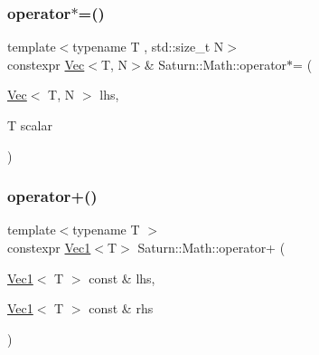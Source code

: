 \mbox{\label{namespace_saturn_1_1_math_a7bfe08b15fdd66d20ee95faf2a3327cf}} 
\subsubsection{\texorpdfstring{operator$\ast$=()}{operator*=()}}
{\footnotesize\ttfamily template$<$typename T , std\+::size\+\_\+t N$>$ \\
constexpr \mbox{\hyperlink{class_saturn_1_1_math_1_1_vec}{Vec}}$<$T, N$>$\& Saturn\+::\+Math\+::operator$\ast$= (\begin{DoxyParamCaption}\item[{\mbox{\hyperlink{class_saturn_1_1_math_1_1_vec}{Vec}}$<$ T, N $>$}]{lhs,  }\item[{T}]{scalar }\end{DoxyParamCaption})}

\mbox{\label{namespace_saturn_1_1_math_af62e54a4d566d6102eaed7d3495b89cf}} 
\subsubsection{\texorpdfstring{operator+()}{operator+()}\hspace{0.1cm}{\footnotesize\ttfamily [1/4]}}
{\footnotesize\ttfamily template$<$typename T $>$ \\
constexpr \mbox{\hyperlink{namespace_saturn_1_1_math_acae4f808f0c3284d0b60ee1ac720deaa}{Vec1}}$<$T$>$ Saturn\+::\+Math\+::operator+ (\begin{DoxyParamCaption}\item[{\mbox{\hyperlink{namespace_saturn_1_1_math_acae4f808f0c3284d0b60ee1ac720deaa}{Vec1}}$<$ T $>$ const \&}]{lhs,  }\item[{\mbox{\hyperlink{namespace_saturn_1_1_math_acae4f808f0c3284d0b60ee1ac720deaa}{Vec1}}$<$ T $>$ const \&}]{rhs }\end{DoxyParamCaption})}

\mbox{\label{namespace_saturn_1_1_math_a96a70ad9ebf01c281f9bd4ffa21f654e}} 
